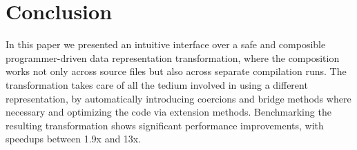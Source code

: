 \section{Conclusion}
\label{sec:concls}

In this paper we presented an intuitive interface over a safe and
composible programmer-driven data representation transformation, where
the composition works not only across source files but also across
separate compilation runs.
The transformation takes care of all the tedium involved in using a
different representation, by automatically introducing coercions and
bridge methods where necessary and optimizing the code via extension
methods. Benchmarking the resulting transformation shows significant
performance improvements, with speedups between 1.9x and 13x.
